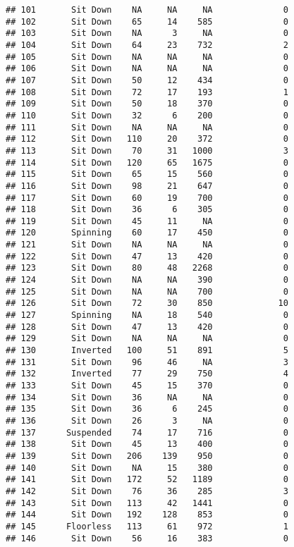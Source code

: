 \documentclass[
]{article}
\begin{document}
\begin{verbatim}
## 101       Sit Down    NA     NA     NA              0
## 102       Sit Down    65     14    585              0
## 103       Sit Down    NA      3     NA              0
## 104       Sit Down    64     23    732              2
## 105       Sit Down    NA     NA     NA              0
## 106       Sit Down    NA     NA     NA              0
## 107       Sit Down    50     12    434              0
## 108       Sit Down    72     17    193              1
## 109       Sit Down    50     18    370              0
## 110       Sit Down    32      6    200              0
## 111       Sit Down    NA     NA     NA              0
## 112       Sit Down   110     20    372              0
## 113       Sit Down    70     31   1000              3
## 114       Sit Down   120     65   1675              0
## 115       Sit Down    65     15    560              0
## 116       Sit Down    98     21    647              0
## 117       Sit Down    60     19    700              0
## 118       Sit Down    36      6    305              0
## 119       Sit Down    45     11     NA              0
## 120       Spinning    60     17    450              0
## 121       Sit Down    NA     NA     NA              0
## 122       Sit Down    47     13    420              0
## 123       Sit Down    80     48   2268              0
## 124       Sit Down    NA     NA    390              0
## 125       Sit Down    NA     NA    700              0
## 126       Sit Down    72     30    850             10
## 127       Spinning    NA     18    540              0
## 128       Sit Down    47     13    420              0
## 129       Sit Down    NA     NA     NA              0
## 130       Inverted   100     51    891              5
## 131       Sit Down    96     46     NA              3
## 132       Inverted    77     29    750              4
## 133       Sit Down    45     15    370              0
## 134       Sit Down    36     NA     NA              0
## 135       Sit Down    36      6    245              0
## 136       Sit Down    26      3     NA              0
## 137      Suspended    74     17    716              0
## 138       Sit Down    45     13    400              0
## 139       Sit Down   206    139    950              0
## 140       Sit Down    NA     15    380              0
## 141       Sit Down   172     52   1189              0
## 142       Sit Down    76     36    285              3
## 143       Sit Down   113     42   1441              0
## 144       Sit Down   192    128    853              0
## 145      Floorless   113     61    972              1
## 146       Sit Down    56     16    383              0

\end{verbatim}
\end{document}
